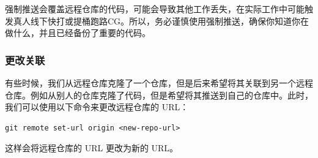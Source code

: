 \documentclass[fontset=none]{ctexart}
\begin{document}
\begin{warning}
    强制推送会覆盖远程仓库的代码，可能会导致其他工作丢失，在实际工作中可能触发真人线下快打或提桶跑路CG。所以，务必谨慎使用强制推送，确保你知道你在做什么，并且已经备份了重要的代码。
\end{warning}

\subsubsection{更改关联}

有些时候，我们从远程仓库克隆了一个仓库，但是后来希望将其关联到另一个远程仓库。例如从别人的仓库克隆了代码，但是希望将其推送到自己的仓库中。此时，我们可以使用以下命令来更改远程仓库的 URL：
\begin{verbatim}
git remote set-url origin <new-repo-url>
\end{verbatim}
这样会将远程仓库的 URL 更改为新的 URL。
\end{document}
